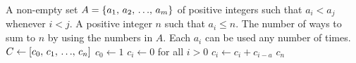 
\begin{algorithmic}[1]
\Require A non-empty set $A = \left\{{{a}_1},\, {{a}_2},\, {\dots},\, {{a}_{m}}\right\}$ of positive integers
such that $a_i < a_j$ whenever $i < j$.  A positive integer $n$ such
that $a_i \leq n$.
\Ensure The number of ways to sum to $n$ by using the numbers in $A$.
Each $a_i$ can be used any number of times.
\State $C \gets \left[ {c_0},\, {c_1},\, {\dots},\, {c_n} \right]$
\State $c_0 \gets 1$
\State $c_i \gets 0$ for all $i > 0$
    \State $c_i \gets c_i + c_{i-a}$
  \EndFor
\EndFor
\State \Return $c_n$
\end{algorithmic}
